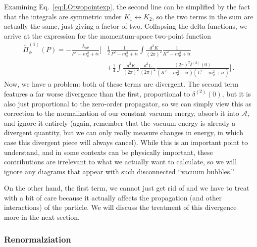 \documentclass{article}
\newcommand{\td}[1]{\tilde{#1}}
\numberwithin{equation}{subsection}
\begin{document}
Examining Eq.~\eqref{eq:LOtwopointexp}, the second line can be simplified by the fact that the integrals are symmetric under $K_1\leftrightarrow K_2$, so the two terms in the sum are 
actually the same, just giving a factor of two. Collapsing the delta functions, we arrive at the expression for the momentum-space two-point function
\begin{equation}\begin{split}\label{eq:Pi1}
    \td\Pi_\phi^{(1)}(P) = -\frac{\lambda_{\phi\theta}}{P^2 - m_\phi^2+i\epsilon}\Bigg[&\frac{1}{2}\frac{1}{P^2 - m_\phi^2 + i\epsilon}\int\frac{d^2K}{(2\pi)^2}\frac{1}{K^2 - m_\theta^2 + i\epsilon}\\[0.5em]
    &+ \frac{1}{4}\int\frac{d^2K}{(2\pi)^2}\frac{d^2L}{(2\pi)^2}\frac{(2\pi)^2\delta^{(2)}(0)}{(K^2 - m_\theta^2 + i\epsilon)(L^2 - m_\phi^2 +i\epsilon)}\Bigg]\,.
\end{split}\end{equation}
Now, we have a problem: both of these terms are divergent. The second term features a far worse divergence than the first, proportional to $\delta^{(2)}(0)$, but it is also just 
proportional to the zero-order propagator, so we can simply view this as correction to the normalization of our constant vacuum energy, absorb it into $\mathcal{A}$, and ignore it 
entirely (again, remember that the vacuum energy is already a divergent quantity, but we can only really measure changes in energy, in which case this divergent piece will always cancel). 
While this is an important point to understand, and in some contexts can be physically important, these contributions are irrelevant to what we actually want to calculate, so we will 
ignore any diagrams that appear with such disconnected ``vacuum bubbles.''

On the other hand, the first term, we cannot just get rid of and we have to treat with a bit of care because it actually affects the propagation (and other interactions) of the particle. 
We will discuss the treatment of this divergence more in the next section.

\subsubsection{Renormalziation}
\end{document}
